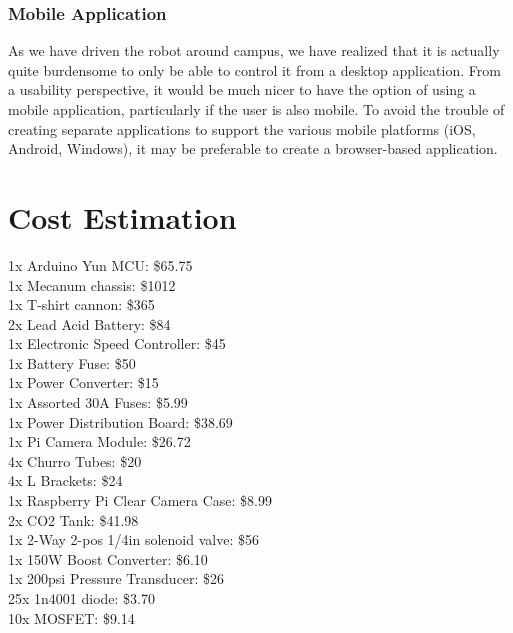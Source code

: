 \documentclass[letterpaper,12pt]{article}
\begin{document}
\subsubsection{Mobile Application}
As we have driven the robot around campus, we have realized that it is actually
quite burdensome to only be able to control it from a desktop application. From
a usability perspective, it would be much nicer to have the option of using a
mobile application, particularly if the user is also mobile. To avoid the
trouble of creating separate applications to support the various mobile
platforms (iOS, Android, Windows), it may be preferable to create a
browser-based application.

\section{Cost Estimation}

\label{sec:cost}
1x Arduino Yun MCU: \$65.75 \\
1x Mecanum chassis: \$1012 \\
1x T-shirt cannon: \$365 \\
2x Lead Acid Battery: \$84 \\
1x Electronic Speed Controller: \$45 \\
1x Battery Fuse: \$50 \\
1x Power Converter: \$15 \\
1x Assorted 30A Fuses: \$5.99 \\
1x Power Distribution Board: \$38.69 \\
1x Pi Camera Module: \$26.72 \\
4x Churro Tubes: \$20 \\
4x L Brackets: \$24 \\
1x Raspberry Pi Clear Camera Case: \$8.99 \\
2x CO2 Tank: \$41.98 \\
1x 2-Way 2-pos 1/4in solenoid valve: \$56 \\
1x 150W Boost Converter: \$6.10 \\
1x 200psi Pressure Transducer: \$26 \\
25x 1n4001 diode: \$3.70 \\
10x MOSFET: \$9.14 \\
\end{document}
